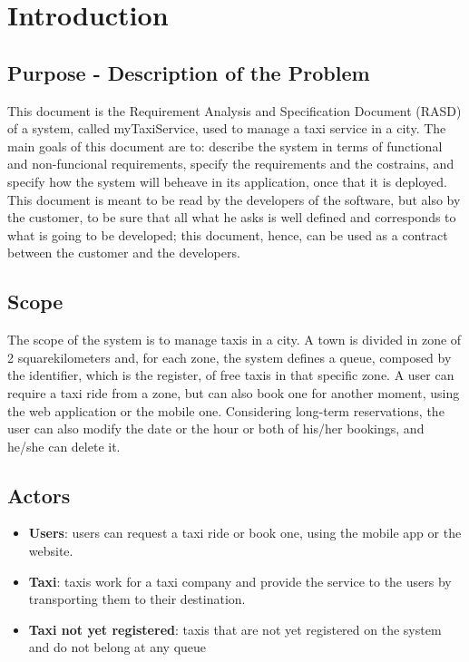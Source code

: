 \section{Introduction}
	\subsection{Purpose - Description of the Problem}
	This document is the Requirement Analysis and Specification Document (RASD) of a system, called myTaxiService, used to manage a taxi service in a city. The main goals of this document are to: describe the system in terms of functional and non-funcional requirements, specify the requirements and the costrains, and specify how the system will beheave in its application, once that it is deployed. This document is meant to be read by the developers of the software, but also by the customer, to be sure that all what he asks is well defined and corresponds to what is going to be developed; this document, hence, can be used as a contract between the customer and the developers.
		
	\subsection{Scope}
	The scope of the system is to manage taxis in a city. A town is divided in zone of 2 squarekilometers and, for each zone, the system defines a queue, composed by the identifier, which is the register, of free taxis in that specific zone. A user can require a taxi ride from a zone, but can also book one for another moment, using the web application or the mobile one. Considering long-term reservations, the user can also modify the date or the hour or both of his/her bookings, and he/she can delete it. 
	
	\subsection{Actors}
	\begin{itemize}
		\item \textbf{Users}: users can request a taxi ride or book one, using the mobile app or the website.
		\item \textbf{Taxi}: taxis work for a taxi company and provide the service to the users by transporting them to their destination.
		\item \textbf{Taxi not yet registered}: taxis that are not yet registered on the system and do not belong at any queue
	\end{itemize}
	
